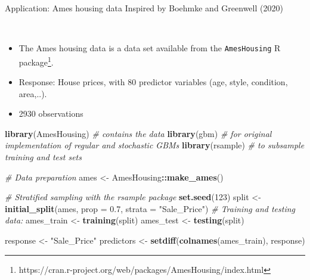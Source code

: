 \documentclass[
  10pt,
  ignorenonframetext,
]{beamer}
\newenvironment{Shaded}{\begin{snugshade}}{\end{snugshade}}
\newcommand{\AttributeTok}[1]{\textcolor[rgb]{0.13,0.29,0.53}{#1}}
\newcommand{\CommentTok}[1]{\textcolor[rgb]{0.56,0.35,0.01}{\textit{#1}}}
\newcommand{\DecValTok}[1]{\textcolor[rgb]{0.00,0.00,0.81}{#1}}
\newcommand{\FloatTok}[1]{\textcolor[rgb]{0.00,0.00,0.81}{#1}}
\newcommand{\FunctionTok}[1]{\textcolor[rgb]{0.13,0.29,0.53}{\textbf{#1}}}
\newcommand{\NormalTok}[1]{#1}
\newcommand{\OtherTok}[1]{\textcolor[rgb]{0.56,0.35,0.01}{#1}}
\newcommand{\SpecialCharTok}[1]{\textcolor[rgb]{0.81,0.36,0.00}{\textbf{#1}}}
\newcommand{\StringTok}[1]{\textcolor[rgb]{0.31,0.60,0.02}{#1}}
\providecommand{\tightlist}{%
  \setlength{\itemsep}{0pt}\setlength{\parskip}{0pt}}
\begin{document}
\begin{frame}[fragile]
\begin{block}{Application: Ames housing data}
\protect\hypertarget{application-ames-housing-data}{}
Inspired by Boehmke and Greenwell (2020)

\(~\)

\begin{itemize}
\tightlist
\item
  The Ames housing data is a data set available from the
  \texttt{AmesHousing} R
  package\footnote{https://cran.r-project.org/web/packages/AmesHousing/index.html}.
\end{itemize}

\vspace{2mm}

\begin{itemize}
\tightlist
\item
  Response: House prices, with 80 predictor variables (age, style,
  condition, area,..).
\end{itemize}

\vspace{2mm}

\begin{itemize}
\tightlist
\item
  2930 observations
\end{itemize}
\end{block}
\end{frame}

\begin{frame}[fragile]
\scriptsize

\begin{Shaded}
\begin{Highlighting}[]
\FunctionTok{library}\NormalTok{(AmesHousing)  }\CommentTok{\# contains the data}
\FunctionTok{library}\NormalTok{(gbm)  }\CommentTok{\# for original implementation of regular and stochastic GBMs}
\FunctionTok{library}\NormalTok{(rsample)  }\CommentTok{\# to subsample training and test sets}

\CommentTok{\# Data preparation}
\NormalTok{ames }\OtherTok{\textless{}{-}}\NormalTok{ AmesHousing}\SpecialCharTok{::}\FunctionTok{make\_ames}\NormalTok{()}

\CommentTok{\# Stratified sampling with the rsample package}
\FunctionTok{set.seed}\NormalTok{(}\DecValTok{123}\NormalTok{)}
\NormalTok{split }\OtherTok{\textless{}{-}} \FunctionTok{initial\_split}\NormalTok{(ames, }\AttributeTok{prop =} \FloatTok{0.7}\NormalTok{, }\AttributeTok{strata =} \StringTok{"Sale\_Price"}\NormalTok{)}
\CommentTok{\# Training and testing data:}
\NormalTok{ames\_train }\OtherTok{\textless{}{-}} \FunctionTok{training}\NormalTok{(split)}
\NormalTok{ames\_test }\OtherTok{\textless{}{-}} \FunctionTok{testing}\NormalTok{(split)}

\NormalTok{response }\OtherTok{\textless{}{-}} \StringTok{"Sale\_Price"}
\NormalTok{predictors }\OtherTok{\textless{}{-}} \FunctionTok{setdiff}\NormalTok{(}\FunctionTok{colnames}\NormalTok{(ames\_train), response)}
\end{Highlighting}
\end{Shaded}
\end{frame}
\end{document}
